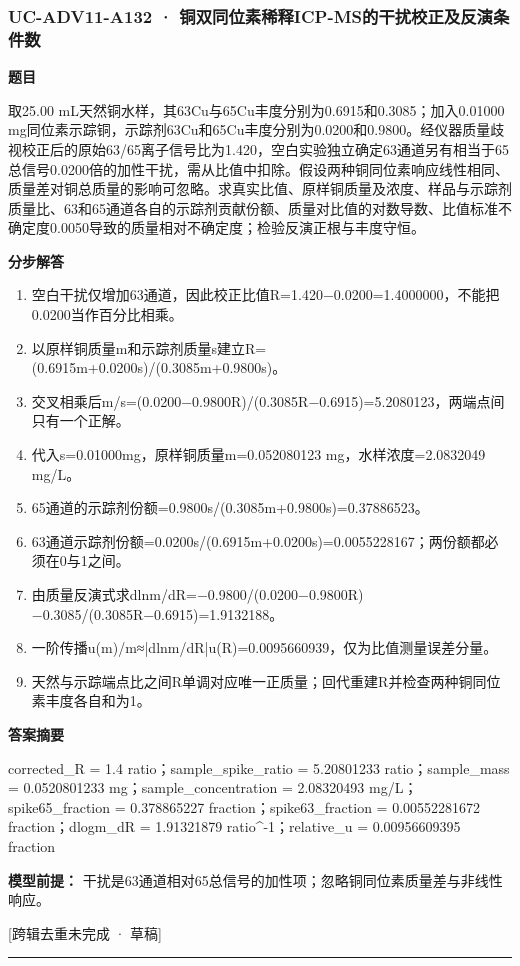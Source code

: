 \documentclass[UTF8,11pt,a4paper]{ctexart}
\begin{document}
\subsubsection*{UC-ADV11-A132 · 铜双同位素稀释ICP-MS的干扰校正及反演条件数}
\noindent\textbf{题目}\par
取25.00 mL天然铜水样，其63Cu与65Cu丰度分别为0.6915和0.3085；加入0.01000 mg同位素示踪铜，示踪剂63Cu和65Cu丰度分别为0.0200和0.9800。经仪器质量歧视校正后的原始63/65离子信号比为1.420，空白实验独立确定63通道另有相当于65总信号0.0200倍的加性干扰，需从比值中扣除。假设两种铜同位素响应线性相同、质量差对铜总质量的影响可忽略。求真实比值、原样铜质量及浓度、样品与示踪剂质量比、63和65通道各自的示踪剂贡献份额、质量对比值的对数导数、比值标准不确定度0.0050导致的质量相对不确定度；检验反演正根与丰度守恒。\par
\medskip\noindent\textbf{分步解答}
\begin{enumerate}
\item 空白干扰仅增加63通道，因此校正比值R=1.420−0.0200=1.4000000，不能把0.0200当作百分比相乘。
\item 以原样铜质量m和示踪剂质量s建立R=(0.6915m+0.0200s)/(0.3085m+0.9800s)。
\item 交叉相乘后m/s=(0.0200−0.9800R)/(0.3085R−0.6915)=5.2080123，两端点间只有一个正解。
\item 代入s=0.01000mg，原样铜质量m=0.052080123 mg，水样浓度=2.0832049 mg/L。
\item 65通道的示踪剂份额=0.9800s/(0.3085m+0.9800s)=0.37886523。
\item 63通道示踪剂份额=0.0200s/(0.6915m+0.0200s)=0.0055228167；两份额都必须在0与1之间。
\item 由质量反演式求dlnm/dR=−0.9800/(0.0200−0.9800R)−0.3085/(0.3085R−0.6915)=1.9132188。
\item 一阶传播u(m)/m≈|dlnm/dR|u(R)=0.0095660939，仅为比值测量误差分量。
\item 天然与示踪端点比之间R单调对应唯一正质量；回代重建R并检查两种铜同位素丰度各自和为1。
\end{enumerate}
\noindent\textbf{答案摘要}\par
corrected\_R = 1.4 ratio；sample\_spike\_ratio = 5.20801233 ratio；sample\_mass = 0.0520801233 mg；sample\_concentration = 2.08320493 mg/L；spike65\_fraction = 0.378865227 fraction；spike63\_fraction = 0.00552281672 fraction；dlogm\_dR = 1.91321879 ratio\textasciicircum{}-1；relative\_u = 0.00956609395 fraction\par
\noindent\textbf{模型前提：}
干扰是63通道相对65总信号的加性项；忽略铜同位素质量差与非线性响应。\par
\noindent\textcolor{red!65!black}{[跨辑去重未完成 · 草稿]} \par
\medskip\hrule\medskip
{}
\end{document}
